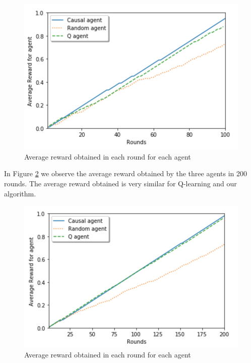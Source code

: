 \documentclass[letterpaper]{article}
\theoremstyle{plain}
\begin{document}
\begin{figure}[ht]
\vskip 0.2in
\begin{center}
\centerline{\includegraphics[width=\columnwidth]{100_rounds_format.png}}
\caption{Average reward obtained in each round for each agent}
\label{100_rounds}
\end{center}
\vskip -0.2in
\end{figure}

In Figure \ref{200_rounds} we observe the average reward obtained by the three agents in 200 rounds. The average reward obtained is very similar for Q-learning and our algorithm.

\begin{figure}[ht]
\vskip 0.2in
\begin{center}
\centerline{\includegraphics[width=\columnwidth]{200_rounds_format.png}}
\caption{Average reward obtained in each round for each agent}
\label{200_rounds}
\end{center}
\vskip -0.2in
\end{figure}
\end{document}
